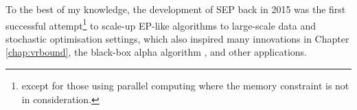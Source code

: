 %
To the best of my knowledge, the development of SEP back in 2015 was the first successful attempt\footnote{except for those using parallel computing where the memory constraint is not in consideration.} to scale-up EP-like algorithms to large-scale data and stochastic optimisation settings, which also inspired many innovations in Chapter \ref{chap:vrbound}, the black-box alpha algorithm \citep{hernandez-lobato:bbalpha2016}, and other applications.

